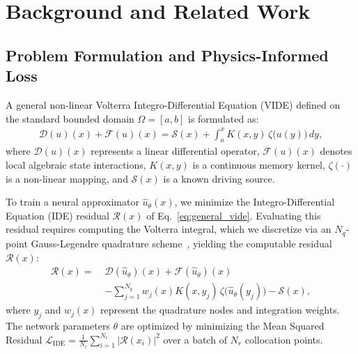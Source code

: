 
\section{Background and Related Work}
\label{sec:background}

\subsection{Problem Formulation and Physics-Informed Loss}
A general non-linear Volterra Integro-Differential Equation (VIDE) defined on the standard bounded domain $\Omega = [a, b]$ is formulated as:
\begin{equation}
    \begin{aligned}
        \mathcal{D}(u)(x) + \mathcal{F}(u)(x) 
        = \mathcal{S}(x) + \int_{a}^{x} K(x, y) \, \zeta\big(u(y)\big) \, dy,
    \end{aligned}
    \label{eq:general_vide}
\end{equation}
where $\mathcal{D}(u)(x)$ represents a linear differential operator, $\mathcal{F}(u)(x)$ denotes local algebraic state interactions, $K(x, y)$ is a continuous memory kernel, $\zeta(\cdot)$ is a non-linear mapping, and $\mathcal{S}(x)$ is a known driving source. 

To train a neural approximator $\hat{u}_\theta(x)$, we minimize the Integro-Differential Equation (IDE) residual $ \mathcal{R}(x)$ of Eq.~\eqref{eq:general_vide}. Evaluating this residual requires computing the Volterra integral, which we discretize via an $N_q$-point Gauss-Legendre quadrature scheme~\cite{moghaddam2025risn,aghaei2024pinnies}, yielding the computable residual $\mathcal{R}(x)$:
\begin{equation}
    \begin{aligned}
        \mathcal{R}(x) = \;&\mathcal{D}(\hat{u}_\theta)(x) + \mathcal{F}(\hat{u}_\theta)(x) \\
        &- \sum_{j=1}^{N_q} w_j(x) K(x, y_j) \, \zeta\big(\hat{u}_\theta(y_j)\big) - \mathcal{S}(x),
    \end{aligned}
    \label{eq:coupled_residual}
\end{equation}
where $y_j$ and $w_j(x)$ represent the quadrature nodes and integration weights. The network parameters $\theta$ are optimized by minimizing the Mean Squared Residual $\mathcal{L}_{\text{IDE}} = \frac{1}{N_r} \sum_{i=1}^{N_r} | \mathcal{R}(x_i) |^2$ over a batch of $N_r$ collocation points.

